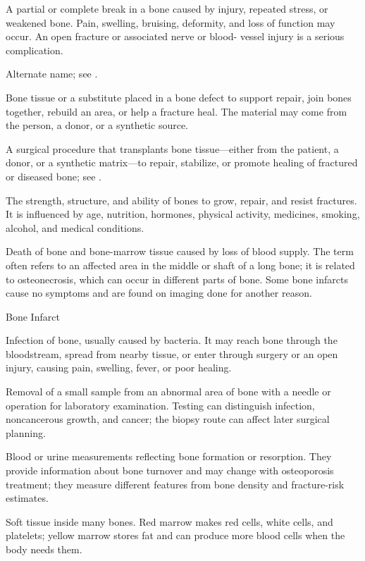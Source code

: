  A partial or complete break in a bone caused by
injury, repeated stress, or weakened bone. Pain, swelling, bruising, deformity,
and loss of function may occur. An open fracture or associated nerve or blood-
vessel injury is a serious complication.

 Alternate name; see .

 Bone tissue or a substitute placed in a bone defect to support repair, join bones together, rebuild an area, or help a fracture heal. The material may come from the person, a donor, or a synthetic source.

 A surgical procedure that transplants bone tissue—either from the patient, a donor, or a synthetic matrix—to repair, stabilize, or promote healing of fractured or diseased bone; see .

 The strength, structure, and ability of bones to grow, repair, and resist fractures. It is influenced by age, nutrition, hormones, physical activity, medicines, smoking, alcohol, and medical conditions.

 Death of bone and bone-marrow tissue caused by loss of blood supply. The term often refers to an affected area in the middle or shaft of a long bone; it is related to osteonecrosis, which can occur in different parts of bone. Some bone infarcts cause no symptoms and are found on imaging done for another reason.

\synonyms
Bone Infarct

 Infection of bone, usually caused by bacteria. It may reach bone through the bloodstream, spread from nearby tissue, or enter through surgery or an open injury, causing pain, swelling, fever, or poor healing.

 Removal of a small sample from an abnormal area of bone with a needle or operation for laboratory examination. Testing can distinguish infection, noncancerous growth, and cancer; the biopsy route can affect later surgical planning.

 Blood or urine measurements reflecting
bone formation or resorption. They provide information about bone turnover and
may change with osteoporosis treatment; they measure different features from
bone density and fracture-risk estimates.

 Soft tissue inside many bones. Red marrow makes red cells, white cells, and platelets; yellow marrow stores fat and can produce more blood cells when the body needs them.

